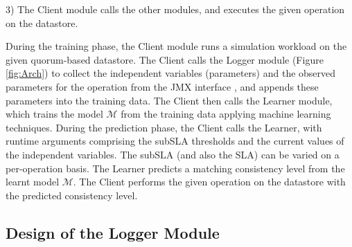 \documentclass[conference]{IEEEtran}
\begin{document}
    3) The Client module calls the other modules, and executes the given operation on the datastore.
\par During the training phase, the Client module runs a simulation workload on the given quorum-based datastore. The Client calls the Logger module (Figure \ref{fig:Arch}) to collect the independent variables (parameters) and the observed parameters for the operation from the JMX interface \cite{Lakshman:2010:CDS:1773912.1773922}, and appends these parameters into the training data. The Client then calls the Learner module, which trains the model $\mathcal{M}$ from the training data applying machine learning techniques.
During the prediction phase, the Client calls the Learner, with runtime arguments comprising the subSLA thresholds and the current values of the independent variables.
   The subSLA (and also the SLA) can be varied on a per-operation basis. The Learner predicts a matching consistency level from the learnt model $\mathcal{M}$. The Client performs the given operation on the datastore with the predicted consistency level.


\subsection{Design of the Logger Module}\label{sec:logdes}
\end{document}
